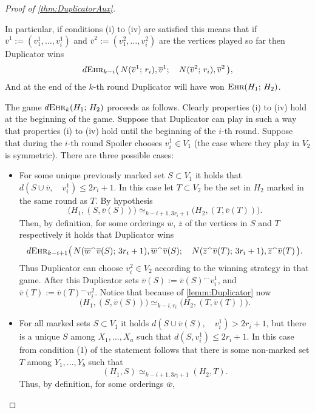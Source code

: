 \documentclass[12pt,notitlepage,a4paper]{article}
\theoremstyle{definition}
\newcommand{\ehr}{\textsc{Ehr}}
\begin{document}
\begin{proof}[Proof of \cref{thm:DuplicatorAux}]
\begin{itemize}
		
	\end{itemize}
	In particular, if conditions (i) to (iv) are satisfied this means
	that if $\overline{v}^1:=(v^1_1,\dots,v^1_i)$ and
	$\overline{v}^2:=(v^2_1,\dots, v^2_i)$ are the vertices played so far
	then Duplicator wins
	\[
	d\ehr_{k-i}\big(\,
	N(\overline{v}^1;\, r_i), \overline{v}^1; \quad
	N(\overline{v}^2;\, r_i),\overline{v}^2 \,
	\big),	
	\]
	And at the end of the $k$-th round Duplicator will have won
	$\ehr(H_1;\, H_2)$. \par
	The game $d\ehr_k(H_1; \, H_2)$ proceeds as follows.
	Clearly properties (i) to (iv) hold at the beginning of 
	the game.  Suppose that
	Duplicator can play in such a way that properties (i) to (iv) hold 
	until the beginning of the $i$-th round. Suppose that
	during the $i$-th round Spoiler chooses $v^1_i\in V_1$ 
	(the case where they play in $V_2$ is symmetric). There are 
	three possible cases:
	\begin{itemize}
		\item For some unique previously marked set $S\subset V_1$ 
		it holds that $d(S\cup \overline{v},\quad v^1_i)\leq 2r_i +1$. 
		In this case let $T\subset V_2$ be the set in $H_2$ marked in the 
		same round as $T$. By hypothesis 
		\[ \big(H_1,(S,\overline{v}(S))\big)
		\simeq_{k-i+1,3r_i+1}
		\big(H_2,(T,\overline{v}(T))\big). 		
		\]
		Then, by definition,
		for some orderings $\overline{w}$, $\overline{z}$
		of the vertices in $S$ and $T$ respectively it holds that
		Duplicator wins
		\[
		d\ehr_{k-i+1}\big(\,
		N(\overline{w}^\smallfrown \overline{v}(S); \, 3r_i	+ 1)
		, \overline{w}^\smallfrown \overline{v}(S); \quad
		N(\overline{z}^\smallfrown \overline{v}(T); \, 3r_i	+ 1)
		, \overline{z}^\smallfrown \overline{v}(T)\,	
		\big).		
		\]
		Thus Duplicator can choose $v^2_i\in V_2$ according to the 
		winning strategy in that game. After this Duplicator sets 
		$\overline{v}(S):= \overline{v}(S)^\smallfrown v^1_i$, and
		$\overline{v}(T):= \overline{v}(T)^\smallfrown v^2_i$. Notice
		that because of \cref{lemm:Duplicator} now
		\[
		\big(H_1, (S,\overline{v}(S))\big)\simeq_{k-i,r_i}
		\big(H_2, (T,\overline{v}(T))\big).
		\]
		\item For all marked sets $S\subset V_1$ it holds
		$d(S\cup \overline{v}(S), \quad v^1_i)>2r_i +1$, but there is
		a unique $S$ among $X_1,\dots, X_a$ such that
		$d(S,v^1_i)\leq 2r_i+1$. In this case from condition (1)
		of the statement follows that there is some non-marked
		set $T$ among $Y_1,\dots, Y_b$ such that
		\[
		(H_1,S)\simeq_{k-i+1,3r_i+1} (H_2,T).\] 
		Thus, by definition, for some orderings $\overline{w}$, 

\end{itemize}
\end{proof}
\end{document}
